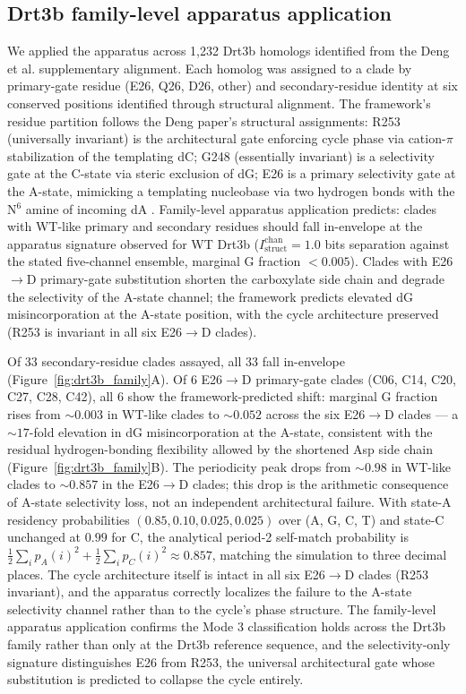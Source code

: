 \documentclass[aps,prx,reprint,amsmath,amssymb,floatfix,superscriptaddress,nofootinbib]{revtex4-2}
\theoremstyle{plain-thm}
\theoremstyle{definition-thm}
\newcommand{\Istructchan}{I_{\mathrm{struct}}^{\mathrm{chan}}}
\begin{document}
\subsection{Drt3b family-level apparatus application}

We applied the apparatus across 1{,}232 Drt3b homologs identified from the Deng et al. supplementary alignment. Each homolog was assigned to a clade by primary-gate residue (E26, Q26, D26, other) and secondary-residue identity at six conserved positions identified through structural alignment. The framework's residue partition follows the Deng paper's structural assignments: R253 (universally invariant) is the architectural gate enforcing cycle phase via cation-$\pi$ stabilization of the templating dC; G248 (essentially invariant) is a selectivity gate at the C-state via steric exclusion of dG; E26 is a primary selectivity gate at the A-state, mimicking a templating nucleobase via two hydrogen bonds with the N$^6$ amine of incoming dA \citep{Deng2026}. Family-level apparatus application predicts: clades with WT-like primary and secondary residues should fall in-envelope at the apparatus signature observed for WT Drt3b ($\Istructchan = 1.0$ bits separation against the stated five-channel ensemble, marginal G fraction $< 0.005$). Clades with E26$\to$D primary-gate substitution shorten the carboxylate side chain and degrade the selectivity of the A-state channel; the framework predicts elevated dG misincorporation at the A-state position, with the cycle architecture preserved (R253 is invariant in all six E26$\to$D clades).

Of 33 secondary-residue clades assayed, all 33 fall in-envelope (Figure~\ref{fig:drt3b_family}A). Of 6 E26$\to$D primary-gate clades (C06, C14, C20, C27, C28, C42), all 6 show the framework-predicted shift: marginal G fraction rises from $\sim 0.003$ in WT-like clades to $\sim 0.052$ across the six E26$\to$D clades --- a $\sim 17$-fold elevation in dG misincorporation at the A-state, consistent with the residual hydrogen-bonding flexibility allowed by the shortened Asp side chain (Figure~\ref{fig:drt3b_family}B). The periodicity peak drops from $\sim 0.98$ in WT-like clades to $\sim 0.857$ in the E26$\to$D clades; this drop is the arithmetic consequence of A-state selectivity loss, not an independent architectural failure. With state-A residency probabilities $(0.85, 0.10, 0.025, 0.025)$ over (A, G, C, T) and state-C unchanged at $0.99$ for C, the analytical period-2 self-match probability is $\frac{1}{2}\sum_i p_A(i)^2 + \frac{1}{2}\sum_i p_C(i)^2 \approx 0.857$, matching the simulation to three decimal places. The cycle architecture itself is intact in all six E26$\to$D clades (R253 invariant), and the apparatus correctly localizes the failure to the A-state selectivity channel rather than to the cycle's phase structure. The family-level apparatus application confirms the Mode 3 classification holds across the Drt3b family rather than only at the Drt3b reference sequence, and the selectivity-only signature distinguishes E26 from R253, the universal architectural gate whose substitution is predicted to collapse the cycle entirely.
\end{document}
